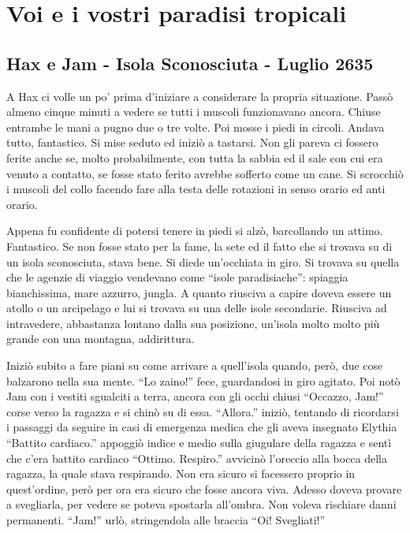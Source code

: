 \chapter{Voi e i vostri paradisi tropicali}

  \section{Hax e Jam - Isola Sconosciuta - Luglio 2635}

    A Hax ci volle un po' prima d'iniziare a considerare la propria
    situazione. Passò almeno cinque minuti a vedere se tutti i muscoli
    funzionavano ancora. Chiuse entrambe le mani a pugno due o tre volte.
    Poi mosse i piedi in circoli. Andava tutto, fantastico. Si mise seduto
    ed iniziò a tastarsi. Non gli pareva ci fossero ferite anche se, molto
    probabilmente, con tutta la sabbia ed il sale con cui era venuto a
    contatto, se fosse stato ferito avrebbe sofferto come un cane. Si
    scrocchiò i muscoli del collo facendo fare alla testa delle rotazioni
    in senso orario ed anti orario.

    Appena fu confidente di potersi tenere in piedi si alzò, barcollando un
    attimo. Fantastico. Se non fosse stato per la fame, la sete ed il fatto
    che si trovava su di un isola sconosciuta, stava bene. Si diede
    un'occhiata in giro. Si trovava su quella che le agenzie di viaggio
    vendevano come ``isole paradisiache'': spiaggia bianchissima, mare
    azzurro, jungla. A quanto riusciva a capire doveva essere un atollo o
    un arcipelago e lui si trovava su una delle isole secondarie. Riusciva
    ad intravedere, abbastanza lontano dalla sua posizione, un'isola molto
    molto più grande con una montagna, addirittura.

    Iniziò subito a fare piani su come arrivare a quell'isola quando, però,
    due cose balzarono nella sua mente. ``Lo zaino!'' fece, guardandosi in
    giro agitato. Poi notò Jam con i vestiti sgualciti a terra, ancora con
    gli occhi chiusi ``Occazzo, Jam!'' corse verso la ragazza e si chinò su
    di essa. ``Allora.'' iniziò, tentando di ricordarsi i passaggi da
    seguire in casi di emergenza medica che gli aveva insegnato Elythia
    ``Battito cardiaco.'' appoggiò indice e medio sulla giugulare della
    ragazza e sentì che c'era battito cardiaco ``Ottimo. Respiro.''
    avvicinò l'oreccio alla bocca della ragazza, la quale stava respirando.
    Non era sicuro si facessero proprio in quest'ordine, però per ora era
    sicuro che fosse ancora viva. Adesso doveva provare a svegliarla, per
    vedere se poteva spostarla all'ombra. Non voleva rischiare danni
    permanenti. ``Jam!'' urlò, stringendola alle braccia ``Oi! Svegliati!''

